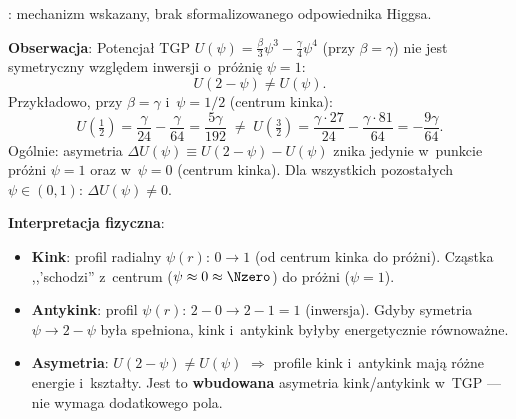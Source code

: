 \begin{hypothesis}%
\label{hyp:chirality-kink}
: mechanizm wskazany, brak sformalizowanego
odpowiednika Higgsa.

\medskip
\textbf{Obserwacja}: Potencja\l{} TGP
$U(\psi) = \tfrac{\beta}{3}\psi^3 - \tfrac{\gamma}{4}\psi^4$ (przy $\beta=\gamma$)
nie jest symetryczny wzgl\k{e}dem inwersji o~pr\'o\.zni\k{e} $\psi = 1$:
\begin{equation}\label{eq:U-asymmetry}
  U(2 - \psi) \neq U(\psi).
\end{equation}
Przyk\l{}adowo, przy $\beta = \gamma$ i~$\psi = 1/2$ (centrum kinka):
\begin{equation}
  U\!\left(\tfrac{1}{2}\right)
  = \frac{\gamma}{24} - \frac{\gamma}{64}
  = \frac{5\gamma}{192}
  \;\neq\;
  U\!\left(\tfrac{3}{2}\right)
  = \frac{\gamma\cdot 27}{24} - \frac{\gamma\cdot 81}{64}
  = -\frac{9\gamma}{64}.
\end{equation}
Og\'olnie: asymetria $\Delta U(\psi) \equiv U(2-\psi) - U(\psi)$ znika
jedynie w~punkcie pr\'o\.zni $\psi = 1$ oraz w~$\psi = 0$
(centrum kinka).
Dla wszystkich pozosta\l{}ych $\psi \in (0,1)$: $\Delta U(\psi) \neq 0$.

\medskip
\textbf{Interpretacja fizyczna}:
\begin{itemize}[nosep]
  \item \textbf{Kink}: profil radialny $\psi(r)$: $0 \to 1$ (od centrum kinka do pr\'o\.zni).
    Cz\k{a}stka ,,'schodzi'' z~centrum ($\psi \approx 0 \approx \Nzero$)
    do pr\'o\.zni ($\psi = 1$).
  \item \textbf{Antykink}: profil $\psi(r)$: $2-0 \to 2-1 = 1$ (inwersja).
    Gdyby symetria $\psi \to 2-\psi$ by\l{}a spe\l{}niona,
    kink i~antykink by\l{}yby energetycznie r\'ownowa\.zne.
  \item \textbf{Asymetria}: $U(2-\psi) \neq U(\psi)$
    $\Rightarrow$ profile kink i~antykink maj\k{a} r\'o\.zne energie i~kszta\l{}ty.
    Jest to \textbf{wbudowana} asymetria kink/antykink w~TGP
    --- nie wymaga dodatkowego pola.
\end{itemize}


\end{hypothesis}
